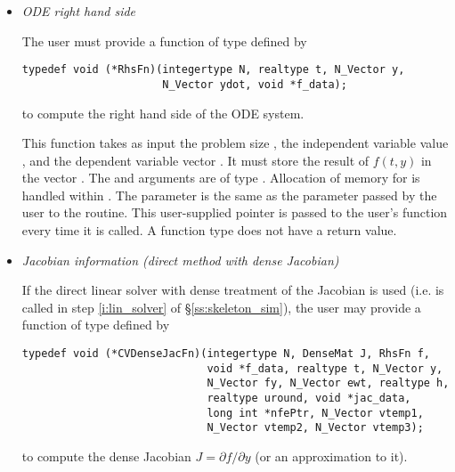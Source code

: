 \begin{itemize}
%
%
\item {\em ODE right hand side}

  The user must provide a function of type  defined by
\begin{verbatim}
typedef void (*RhsFn)(integertype N, realtype t, N_Vector y, 
                      N_Vector ydot, void *f_data);
\end{verbatim}
  to compute the right hand side of the ODE system.
  
  This function takes as input the problem size , the independent variable  
  value , and the dependent variable vector .  It must store the    
  result of $f(t,y)$ in the vector .  The  and  arguments 
  are of type . Allocation of memory for  is handled within {\cvodes}.
  The  parameter is the same as the  parameter passed by 
  the user to the  routine. This user-supplied pointer is passed to 
  the user's  function every time it is called.                                       
  A  function type does not have a return value.                        
%
%
\item {\em Jacobian information (direct method with dense Jacobian)}
  \label{p:djac}
  
  If the direct linear solver with dense treatment of the Jacobian is used 
  (i.e.  is called in step \ref{i:lin_solver} of \S\ref{ss:skeleton_sim}), 
  the user may provide a function of type  defined by
\begin{verbatim}
typedef void (*CVDenseJacFn)(integertype N, DenseMat J, RhsFn f, 
                             void *f_data, realtype t, N_Vector y, 
                             N_Vector fy, N_Vector ewt, realtype h, 
                             realtype uround, void *jac_data,
                             long int *nfePtr, N_Vector vtemp1,
                             N_Vector vtemp2, N_Vector vtemp3);
\end{verbatim}
  to compute the dense Jacobian $J = \partial f / \partial y$ (or an approximation to it).
  

\end{itemize}
